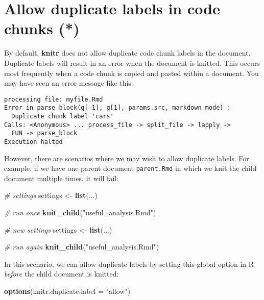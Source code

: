 \documentclass[
  11pt,
]{krantz}
\newenvironment{Shaded}{\begin{snugshade}}{\end{snugshade}}
\newcommand{\CommentTok}[1]{\textcolor[rgb]{0.37,0.37,0.37}{\textit{#1}}}
\newcommand{\DataTypeTok}[1]{\textcolor[rgb]{0.27,0.27,0.27}{#1}}
\newcommand{\KeywordTok}[1]{\textcolor[rgb]{0.27,0.27,0.27}{\textbf{#1}}}
\newcommand{\NormalTok}[1]{#1}
\newcommand{\StringTok}[1]{\textcolor[rgb]{0.5,0.5,0.5}{#1}}
\begin{document}
\hypertarget{duplicate-label}{%
\section{Allow duplicate labels in code chunks (*)}\label{duplicate-label}}

By default, \textbf{knitr} does not allow duplicate code chunk labels in the document. Duplicate labels will result in an error when the document is knitted. This occurs most frequently when a code chunk is copied and pasted within a document. You may have seen an error message like this:

\begin{verbatim}
processing file: myfile.Rmd
Error in parse_block(g[-1], g[1], params.src, markdown_mode) :
  Duplicate chunk label 'cars'
Calls: <Anonymous> ... process_file -> split_file -> lapply ->
  FUN -> parse_block
Execution halted
\end{verbatim}

However, there are scenarios where we may wish to allow duplicate labels. For example, if we have one parent document \texttt{parent.Rmd} in which we knit the child document multiple times, it will fail:

\begin{Shaded}
\begin{Highlighting}[]
\CommentTok{# settings}
\NormalTok{settings <-}\StringTok{ }\KeywordTok{list}\NormalTok{(...)}

\CommentTok{# run once}
\KeywordTok{knit_child}\NormalTok{(}\StringTok{"useful_analysis.Rmd"}\NormalTok{)}

\CommentTok{# new settings}
\NormalTok{settings <-}\StringTok{ }\KeywordTok{list}\NormalTok{(...)}

\CommentTok{# run again}
\KeywordTok{knit_child}\NormalTok{(}\StringTok{"useful_analysis.Rmd"}\NormalTok{)}
\end{Highlighting}
\end{Shaded}

In this scenario, we can allow duplicate labels by setting this global option in R \emph{before} the child document is knitted:

\begin{Shaded}
\begin{Highlighting}[]
\KeywordTok{options}\NormalTok{(}\DataTypeTok{knitr.duplicate.label =} \StringTok{"allow"}\NormalTok{)}
\end{Highlighting}
\end{Shaded}
\end{document}
